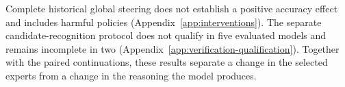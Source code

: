 Complete historical global steering does not establish a positive accuracy effect and includes harmful policies (Appendix~\ref{app:interventions}).
%
The separate candidate-recognition protocol does not qualify in five evaluated models and remains incomplete in two (Appendix~\ref{app:verification-qualification}).
%
Together with the paired continuations, these results separate a change in the selected experts from a change in the reasoning the model produces.
%
